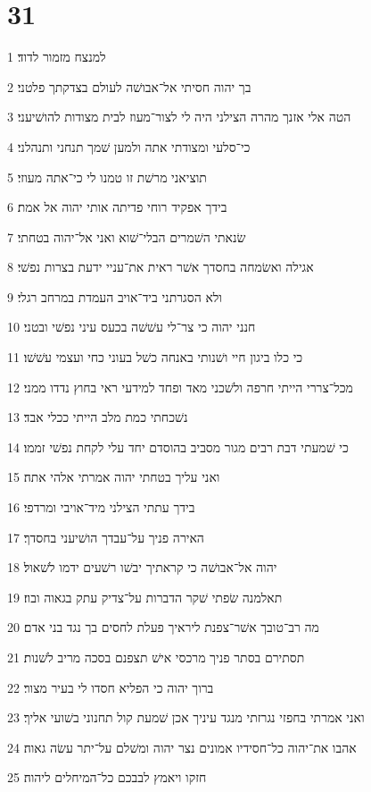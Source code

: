 \chapter{31}

\par 1 למנצח מזמור לדוד׃
\par 2 בך יהוה חסיתי אל־אבושׁה לעולם בצדקתך פלטני׃
\par 3 הטה אלי אזנך מהרה הצילני היה לי לצור־מעוז לבית מצודות להושׁיעני׃
\par 4 כי־סלעי ומצודתי אתה ולמען שׁמך תנחני ותנהלני׃
\par 5 תוציאני מרשׁת זו טמנו לי כי־אתה מעוזי׃
\par 6 בידך אפקיד רוחי פדיתה אותי יהוה אל אמת׃
\par 7 שׂנאתי השׁמרים הבלי־שׁוא ואני אל־יהוה בטחתי׃
\par 8 אגילה ואשׂמחה בחסדך אשׁר ראית את־עניי ידעת בצרות נפשׁי׃
\par 9 ולא הסגרתני ביד־אויב העמדת במרחב רגלי׃
\par 10 חנני יהוה כי צר־לי עשׁשׁה בכעס עיני נפשׁי ובטני׃
\par 11 כי כלו ביגון חיי ושׁנותי באנחה כשׁל בעוני כחי ועצמי עשׁשׁו׃
\par 12 מכל־צררי הייתי חרפה ולשׁכני מאד ופחד למידעי ראי בחוץ נדדו ממני׃
\par 13 נשׁכחתי כמת מלב הייתי ככלי אבד׃
\par 14 כי שׁמעתי דבת רבים מגור מסביב בהוסדם יחד עלי לקחת נפשׁי זממו׃
\par 15 ואני עליך בטחתי יהוה אמרתי אלהי אתה׃
\par 16 בידך עתתי הצילני מיד־אויבי ומרדפי׃
\par 17 האירה פניך על־עבדך הושׁיעני בחסדך׃
\par 18 יהוה אל־אבושׁה כי קראתיך יבשׁו רשׁעים ידמו לשׁאול׃
\par 19 תאלמנה שׂפתי שׁקר הדברות על־צדיק עתק בגאוה ובוז׃
\par 20 מה רב־טובך אשׁר־צפנת ליראיך פעלת לחסים בך נגד בני אדם׃
\par 21 תסתירם בסתר פניך מרכסי אישׁ תצפנם בסכה מריב לשׁנות׃
\par 22 ברוך יהוה כי הפליא חסדו לי בעיר מצור׃
\par 23 ואני אמרתי בחפזי נגרזתי מנגד עיניך אכן שׁמעת קול תחנוני בשׁועי אליך׃
\par 24 אהבו את־יהוה כל־חסידיו אמונים נצר יהוה ומשׁלם על־יתר עשׂה גאוה׃
\par 25 חזקו ויאמץ לבבכם כל־המיחלים ליהוה׃

